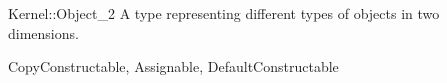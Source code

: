 \begin{ccRefConcept}{Kernel::Object_2}
A type representing different types of objects in two dimensions.

\ccRefines
CopyConstructable, Assignable, DefaultConstructable 

\ccSeeAlso
{} \\
\\
 \\
 \\

\end{ccRefConcept}
